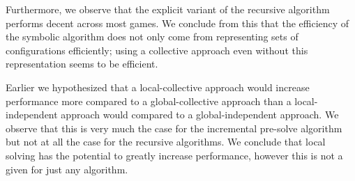 Furthermore, we observe that the explicit variant of the recursive algorithm performs decent across most games. We conclude from this that the efficiency of the symbolic algorithm does not only come from representing sets of configurations efficiently; using a collective approach even without this representation seems to be efficient.

Earlier we hypothesized that a local-collective approach would increase performance more compared to a global-collective approach than a local-independent approach would compared to a global-independent approach. We observe that this is very much the case for the incremental pre-solve algorithm but not at all the case for the recursive algorithms. We conclude that local solving has the potential to greatly increase performance, however this is not a given for just any algorithm.